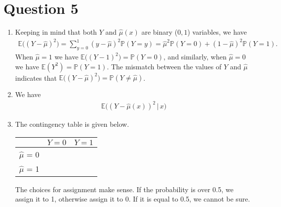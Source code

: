 \documentclass[10pt]{article}
\begin{document}
\section{Question 5} \noindent
\begin{enumerate}
    \item Keeping in mind that both \(Y\) and \(\hat{\mu}(x)\) are binary (\(0,1\)) variables, we have 
    \begin{align*}
        \mathbb{E}\big( (Y - \hat{\mu})^2 \big)
        = \sum_{y = 0}^1 (y - \hat{\mu})^2 \mathbb{P}(Y = y)
        = \hat{\mu}^2 \mathbb{P}(Y = 0) + (1 - \hat{\mu})^2 \mathbb{P}(Y = 1).
    \end{align*}
    When \(\hat{\mu} = 1\) we have \(\mathbb{E}\big( (Y - 1)^2 \big) = \mathbb{P}(Y = 0)\), and similarly, when 
    \(\hat{\mu} = 0\) we have \(\mathbb{E}(Y^2) = \mathbb{P}(Y = 1)\). The mismatch between the values of \(Y\) and \(\hat{\mu}\)
    indicates that \(\mathbb{E}\big( (Y - \hat{\mu})^2 \big) = \mathbb{P}(Y \neq \hat{\mu})\).
    \item We have 
    \begin{align*}
        \mathbb{E}\big( (Y - \hat{\mu}(x))^2 \,|\, x \big)
    \end{align*}
    \item The contingency table is given below. 
    \begin{table}
        \centering
        \def\arraystretch{1.25} 
        \begin{tabular}{|c|cc|}
            \hline
            & \(Y = 0\) & \(Y = 1\) \\\hline
            \(\hat{\mu}\) = 0 &  &  \\
            \(\hat{\mu}\) = 1 &  &  \\
            \hline%
        \end{tabular}
    \end{table}
    The choices for assignment make sense. If the probability is over 0.5, we assign it to 1, otherwise assign it to 0. If it is equal to 0.5, we cannot be sure.
\end{enumerate}

\end{document}
